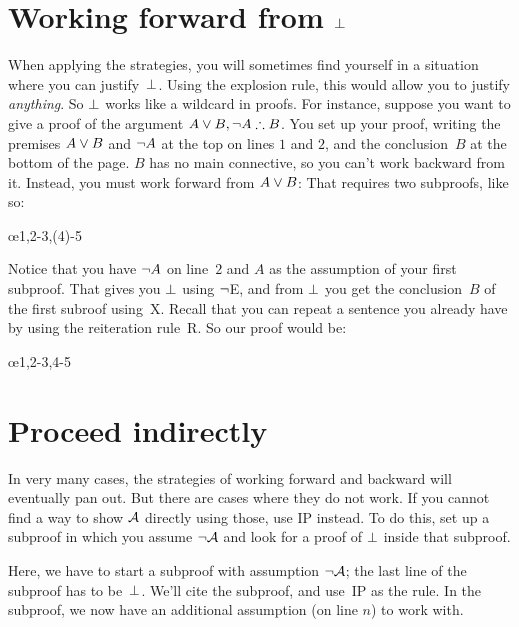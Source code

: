 \section{Working forward from $\bot$}\label{sec:backred}

When applying the strategies, you will sometimes find yourself in a situation where you can justify~$\bot$. Using the explosion rule, this would allow you to justify \emph{anything}. So $\bot$ works like a wildcard in proofs. For instance, suppose you want to give a proof of the argument $A \eor B, \enot A \therefore B$. You set up your proof, writing the premises $A \vee B$ and $\neg A$ at the top on lines $1$ and $2$, and the conclusion~$B$ at the bottom of the page. $B$ has no main connective, so you can't work backward from it. Instead, you must work forward from $A \vee B$: That requires two subproofs, like so:
\begin{fitchproof}
	\open
	\ellipsesline 
	\close 
	\open
	\ellipsesline
	\close
	\oe{1,2-3,(4)-5} 
\end{fitchproof} 
Notice that you have $\neg A$ on line~$2$ and $A$ as the assumption of your first subproof. That gives you $\bot$ using $\neg$E, and from $\bot$ you get the conclusion~$B$ of the first subroof using~X. Recall that you can repeat a sentence you already have by using the reiteration rule~R. So our proof would be:
\begin{fitchproof}
	\open
	\close 
	\open
	\close
	\oe{1,2-3,4-5} 
\end{fitchproof} 

\section{Proceed indirectly}

In very many cases, the strategies of working forward and backward will eventually pan out. But there are cases where they do not work.  If you cannot find a way to show $\mathcal{A}$ directly using those, use IP instead. To do this, set up a subproof in which you assume $\neg\mathcal{A}$ and look for a proof of $\bot$ inside that subproof.

\begin{fitchproof}
\open
{}
\ellipsesline 
{}
\close
{}
\end{fitchproof}
Here, we have to start a subproof with assumption $\neg \mathcal{A}$;
the last line of the subproof has to be~$\bot$. We'll cite the subproof, and use~IP as the rule.  In the subproof, we now have an additional assumption (on line $n$) to work with.

